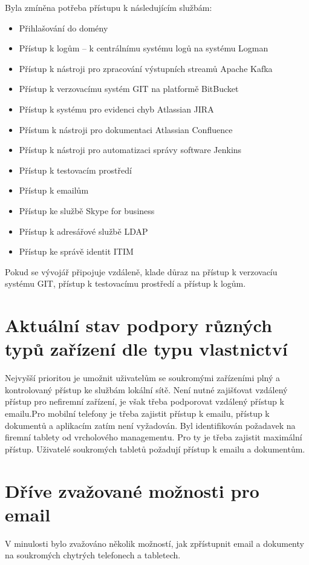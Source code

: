 Byla zmíněna potřeba přístupu k následujícím službám:
\begin{itemize}
    \item Přihlašování do domény
    \item Přístup k logům -- k centrálnímu systému logů na systému Logman
    \item Přístup k nástroji pro zpracování výstupních streamů Apache Kafka
    \item Přístup k verzovacímu systém GIT na platformě BitBucket
    \item Přístup k systému pro evidenci chyb Atlassian JIRA
    \item Přístum k nástroji pro dokumentaci Atlassian Confluence
    \item Přístup k nástroji pro automatizaci správy software Jenkins
    \item Přístup k testovacím prostředí
    \item Přístup k emailům 
    \item Přístup ke službě Skype for business
    \item Přístup k adresářové službě LDAP
    \item Přístup ke správě identit ITIM
\end{itemize}

Pokud se vývojář připojuje vzdáleně, klade důraz na přístup k verzovacíu systému GIT, přístup k testovacímu prostředí a přístup k logům.

\section{Aktuální stav podpory různých typů zařízení dle typu vlastnictví}


Nejvyšší prioritou je umožnit uživatelům se soukromými zařízeními plný a kontrolovaný přístup ke službám lokální sítě. Není nutné zajišťovat vzdálený přístup pro nefiremní zařízení, je však třeba podporovat vzdálený přístup k emailu.Pro mobilní telefony je třeba zajistit přístup k emailu, přístup k dokumentů a aplikacím zatím není vyžadován. Byl identifikován požadavek na firemní tablety od vrcholového managementu. Pro ty je třeba zajistit maximální přístup. Uživatelé soukromých tabletů požadují přístup k emailu a dokumentům.

\section{Dříve zvažované možnosti pro email}
V minulosti bylo zvažováno několik možností, jak zpřístupnit email a dokumenty na soukromých chytrých telefonech a tabletech.

